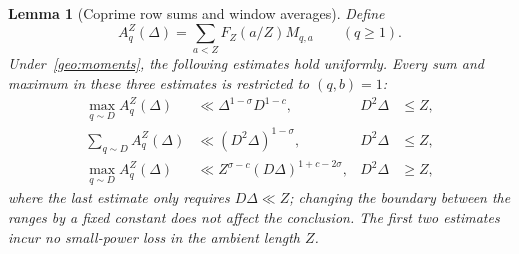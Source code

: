 \documentclass[11pt,a4paper]{article}
\theoremstyle{paperplain}
\newtheorem{lemma}[theorem]{Lemma}
\numberwithin{equation}{section}
\begin{document}
\begin{lemma}[Coprime row sums and window averages]\label{geo:rows}
Define
\[
 A_q^Z(\Delta)=\sum_{a<Z}F_Z(a/Z)M_{q,a}\qquad(q\ge1).
\]
Under~\eqref{geo:moments}, the following estimates hold uniformly.
Every sum and maximum in these three estimates is restricted to $(q,b)=1$:
\begin{align}
 \max_{q\sim D}A_q^Z(\Delta)&\ll
  \Delta^{1-\sigma}D^{1-c},&D^2\Delta&\le Z,
    \label{geo:row-small}\\
 \sum_{q\sim D}A_q^Z(\Delta)&\ll
  (D^2\Delta)^{1-\sigma},&D^2\Delta&\le Z,
    \label{geo:sum-small}\\
 \max_{q\sim D}A_q^Z(\Delta)&\ll
  Z^{\sigma-c}(D\Delta)^{1+c-2\sigma},&D^2\Delta&\ge Z,
    \label{geo:row-large}
\end{align}
where the last estimate only requires $D\Delta\ll Z$; changing the boundary
between the ranges by a fixed constant does not affect the conclusion.
The first two estimates incur no small-power loss in the ambient length $Z$.
\end{lemma}
\end{document}

